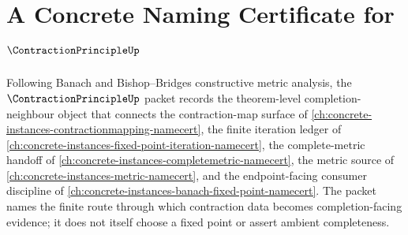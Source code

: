 \chapter{A Concrete Naming Certificate for $\ContractionPrincipleUp$}
\label{ch:concrete-instances-contraction-principle-namecert}

Following Banach and Bishop--Bridges constructive metric analysis, the $\ContractionPrincipleUp$ packet records the theorem-level completion-neighbour object that connects the contraction-map surface of \autoref{ch:concrete-instances-contractionmapping-namecert}, the finite iteration ledger of \autoref{ch:concrete-instances-fixed-point-iteration-namecert}, the complete-metric handoff of \autoref{ch:concrete-instances-completemetric-namecert}, the metric source of \autoref{ch:concrete-instances-metric-namecert}, and the endpoint-facing consumer discipline of \autoref{ch:concrete-instances-banach-fixed-point-namecert}. The packet names the finite route through which contraction data becomes completion-facing evidence; it does not itself choose a fixed point or assert ambient completeness.

